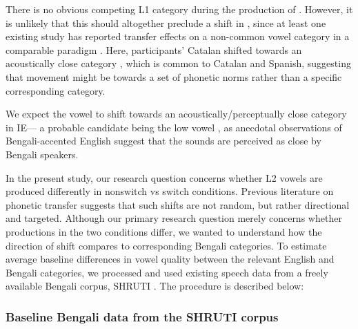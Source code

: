 \documentclass[12 pt]{article}
\newcommand{\nt}[1]{\textipa{[#1]}} %
\begin{document}

There is no obvious competing L1 category during the production of \nt{2}. However, it is unlikely that this should altogether preclude a shift in \nt{2}, since at least one existing study has reported transfer effects on a non-common vowel category in a comparable paradigm \citep{simonet2014phonetic}. Here, participants' Catalan \nt{O} shifted towards an acoustically close category \nt{o}, which is common to Catalan and Spanish, suggesting that movement might be towards a set of phonetic norms rather than a specific corresponding category. 

We expect the vowel \nt{2} to shift towards an acoustically/perceptually close category in IE--- a probable candidate being the low vowel \nt{a:}, as anecdotal observations of Bengali-accented English suggest that the sounds are perceived as close by Bengali speakers. 


In the present study, our research question concerns whether L2 vowels are produced differently in nonswitch vs switch conditions. Previous literature on phonetic transfer suggests that such shifts are not random, but rather directional and targeted. Although our primary research question merely concerns whether productions in the two conditions differ, we wanted to understand how the direction of shift compares to corresponding Bengali categories. To estimate average baseline differences in vowel quality between the relevant English and Bengali categories, we processed and used existing speech data from a freely available Bengali corpus, SHRUTI \citep{shruticorpus}. The procedure is described below:

\subsubsection*{Baseline Bengali data from the SHRUTI corpus}
\end{document}
